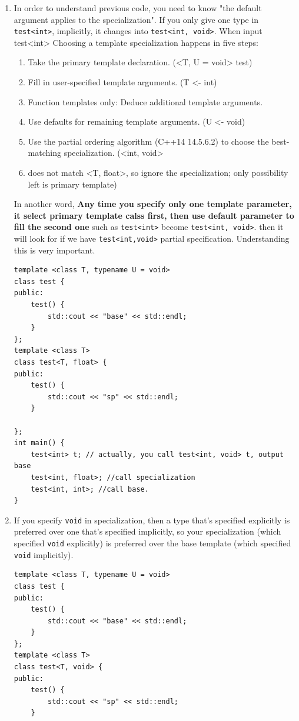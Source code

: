 \documentclass[a4paper,11pt,twoside]{book}
\begin{document}
\begin{itemize}
\begin{enumerate}
	\item In order to understand previous code, you need to know "the default argument applies to the specialization". If you only give one type in \texttt{test<int>}, implicitly, it changes into \texttt{test<int, void>}.  
	When input test<int> Choosing a template specialization happens in five steps:
	\begin{enumerate}
		\item 	Take the primary template declaration. (<T, U = void> test)
		\item 	Fill in user-specified template arguments. (T <- int)
		\item Function templates only: Deduce additional template arguments.
		\item Use defaults for remaining template arguments. (U <- void)
		\item Use the partial ordering algorithm (C++14 14.5.6.2) to choose the best-matching specialization. (<int, void> \item does not match <T, float>, so ignore the specialization; only possibility left is primary template)
	\end{enumerate}
In another word, \textbf{Any time you specify only one template parameter, it select primary template calss first, then use default parameter to fill the second one} such as \texttt{test<int>} become \texttt{test<int, void>}. then it will look for if we have \texttt{test<int,void>} partial specification. Understanding this is very important. 

\begin{lstlisting}
template <class T, typename U = void>
class test {
public:
	test() {
		std::cout << "base" << std::endl;
	}
};
template <class T>
class test<T, float> { 
public:
	test() {
		std::cout << "sp" << std::endl;
	}
	
};
int main() {
	test<int> t; // actually, you call test<int, void> t, output base
	test<int, float>; //call specialization
	test<int, int>; //call base.
}
\end{lstlisting}

	\item If you specify \texttt{void} in specialization, then a type that's specified explicitly is preferred over one that's specified implicitly, so your specialization (which specified \texttt{void} explicitly) is preferred over the base template (which specified \texttt{void} implicitly).
\begin{lstlisting}
template <class T, typename U = void>
class test {
public:
	test() {
		std::cout << "base" << std::endl;
	}
};
template <class T>
class test<T, void> { 
public:
	test() {
		std::cout << "sp" << std::endl;
	}
	

\end{lstlisting}
\end{enumerate}
\end{itemize}
\end{document}
